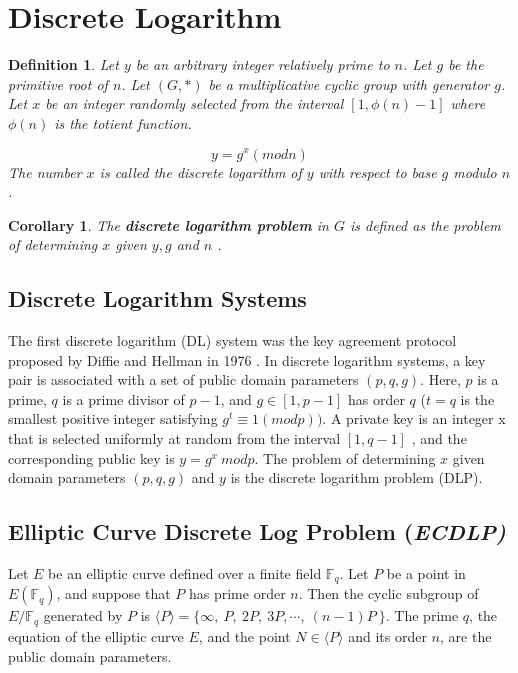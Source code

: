 \documentclass[a4paper,12pt]{report}
\newtheorem{definition}{Definition}
\newtheorem{corollary}{Corollary}
\begin{document}
\section{Discrete Logarithm}
\begin{definition}
Let $y$ be an arbitrary integer relatively prime to $n$. Let $g$ be
the primitive root of $n$. Let $(G, *)$ be a multiplicative cyclic
group with generator $g$. Let $x$ be an integer randomly selected
from the interval $[1, \phi(n)-1]$ where $\phi(n)$ is the totient
function.

\begin{equation}
y = g^x (mod n)
\end{equation}
The number $x$ is called the discrete logarithm of $y$ with respect to base $g$ modulo $n$.\\
\end{definition}

\begin{corollary}
The \textbf{discrete logarithm problem} in $G$ is defined as the
problem of determining $x$ given $y, g$ and $n$ \cite{patil}.
\end{corollary}

\subsection{Discrete Logarithm Systems}
The first discrete logarithm (DL) system was the key agreement
protocol proposed by Diffie and Hellman in 1976 \cite{diffie}. In
discrete logarithm systems, a key pair is associated with a set of
public domain parameters $(p, q, g)$. Here, $p$ is a prime, $q$ is a
prime divisor of $p-1$, and $g \in [1, p-1]$ has order $q$  ($t = q$
is the smallest positive integer satisfying $g^{t} \equiv 1 (mod
p))$. A private key is an integer x that is selected uniformly at
random from the interval $[1, q -1]$ , and the corresponding public
key is $y = g^{x} \  mod p$. The problem of determining $x$ given
domain parameters $(p, q, g)$ and $y$ is the discrete logarithm
problem (DLP).

\subsection{Elliptic Curve Discrete Log Problem (\textit{ECDLP)}}
Let $E$ be an elliptic curve defined over a finite field
$\mathbb{F}_q$. Let $P$ be a point in $E(\mathbb{F}_{q})$, and
suppose that $P$ has prime order $n$. Then the cyclic subgroup of
$E/\mathbb{F}_q$ generated by $P$ is $\langle P \rangle = \{\infty ,
\ P, \ 2P, \ 3P, \cdots, \ (n-1)P \ \} $. The prime $q$, the
equation of the elliptic curve $E$, and the point $N \in \langle P
\rangle $ and its order $n$, are the public domain parameters.
\end{document}

